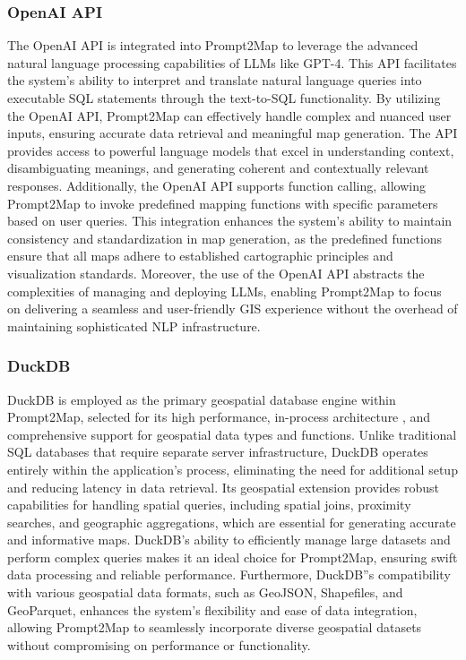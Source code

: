 \subsubsection{OpenAI API}
The OpenAI API is integrated into Prompt2Map to leverage the advanced natural language processing capabilities of LLMs like GPT-4. This API facilitates the system's ability to interpret and translate natural language queries into executable SQL statements through the text-to-SQL functionality. By utilizing the OpenAI API, Prompt2Map can effectively handle complex and nuanced user inputs, ensuring accurate data retrieval and meaningful map generation. The API provides access to powerful language models that excel in understanding context, disambiguating meanings, and generating coherent and contextually relevant responses. Additionally, the OpenAI API supports function calling, allowing Prompt2Map to invoke predefined mapping functions with specific parameters based on user queries. This integration enhances the system's ability to maintain consistency and standardization in map generation, as the predefined functions ensure that all maps adhere to established cartographic principles and visualization standards. Moreover, the use of the OpenAI API abstracts the complexities of managing and deploying LLMs, enabling Prompt2Map to focus on delivering a seamless and user-friendly GIS experience without the overhead of maintaining sophisticated NLP infrastructure.


\subsubsection{DuckDB}
DuckDB is employed as the primary geospatial database engine within Prompt2Map, selected for its high performance, in-process architecture \cite{raasveldt_duckdb_2019},  and comprehensive support for geospatial data types and functions. Unlike traditional SQL databases that require separate server infrastructure, DuckDB operates entirely within the application's process, eliminating the need for additional setup and reducing latency in data retrieval. Its geospatial extension provides robust capabilities for handling spatial queries, including spatial joins, proximity searches, and geographic aggregations, which are essential for generating accurate and informative maps. DuckDB's ability to efficiently manage large datasets and perform complex queries makes it an ideal choice for Prompt2Map, ensuring swift data processing and reliable performance. Furthermore, DuckDB''s compatibility with various geospatial data formats, such as GeoJSON, Shapefiles, and GeoParquet, enhances the system's flexibility and ease of data integration, allowing Prompt2Map to seamlessly incorporate diverse geospatial datasets without compromising on performance or functionality.


